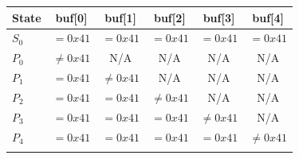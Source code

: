 \begin{table}[!b]
{\begin{tabular*}{20pc}{@{\extracolsep{\fill}}lccccc@{}}\toprule
State  & buf[0] & buf[1] & buf[2] & buf[3] & buf[4]\\ 
\midrule
		$S_0$  &  $=0x41$ & $=0x41$ & $=0x41$ & $=0x41$ & $=0x41$ \\
		$P_0$  &  $\neq0x41$ & N/A & N/A & N/A & N/A \\
		$P_1$  &  $=0x41$ & $\neq0x41$ & N/A & N/A & N/A\\
		$P_2$  &  $=0x41$ & $=0x41$ & $\neq0x41$ & N/A & N/A \\
		$P_3$  &  $=0x41$ & $=0x41$ & $=0x41$ & $\neq0x41$ & N/A \\
		$P_4$  &  $=0x41$ & $=0x41$ & $=0x41$ & $=0x41$ & $\neq0x41$ \\
\botrule
\end{tabular*}}{}
\end{table}


